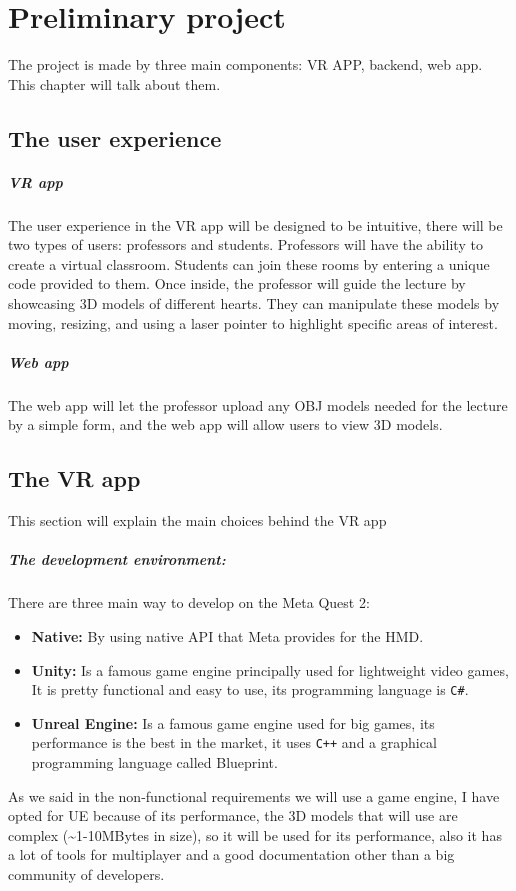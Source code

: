 
\chapter{Preliminary project} %
\noindent
The project is made by three main components: \ac{VR} APP, backend, web app. This chapter will talk about them.
\section{The user experience}
\paragraph{VR app}
The user experience in the \ac{VR} app will be designed to be intuitive, there will be two types of users: professors and students.
Professors will have the ability to create a virtual classroom. Students can join these rooms by entering a unique code provided to them. Once inside, the professor will guide the lecture by showcasing 3D models of different hearts.
They can manipulate these models by moving, resizing, and using a laser pointer to highlight specific areas of interest. 
\paragraph{Web app}
The web app will let the professor upload any OBJ models needed for the lecture by a simple form, and the web app will allow users to view 3D models.

\section{The VR app}
\noindent
This section will explain the main choices behind the \ac{VR} app
\paragraph{The development environment:} 
There are three main way to develop on the Meta Quest 2:

\begin{itemize}
  \item \textbf{Native:} By using native \ac{API} that Meta provides for the \ac{HMD}.
  \item \textbf{Unity:} Is a famous game engine principally used for lightweight video games, It is pretty functional and easy to use, its programming language is \texttt{C\#}. 
  \item \textbf{Unreal Engine:} Is a famous game engine used for big games, its performance is the best in the market, it uses \texttt{C++} and a graphical programming language called Blueprint.
\end{itemize}
\noindent
As we said in the non-functional requirements we will use a game engine, I have opted for \ac{UE} because of its performance, the 3D models that will use are complex (\textasciitilde1-10MBytes in size),
so it will be used for its performance, also it has a lot of tools for multiplayer and a good documentation other than a big community of developers.


